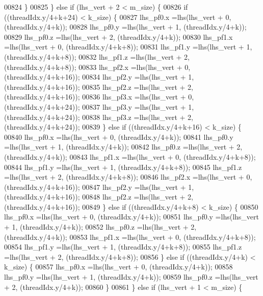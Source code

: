 \begin{DoxyCode}
00824         \}
00825       \} \textcolor{keywordflow}{else} \textcolor{keywordflow}{if} (lhs\_vert + 2 < m\_size) \{
00826         \textcolor{keywordflow}{if} ((threadIdx.y/4+k+24) < k\_size) \{
00827           lhs\_pf0.x =lhs(lhs\_vert + 0, (threadIdx.y/4+k));
00828           lhs\_pf0.y =lhs(lhs\_vert + 1, (threadIdx.y/4+k));
00829           lhs\_pf0.z =lhs(lhs\_vert + 2, (threadIdx.y/4+k));
00830           lhs\_pf1.x =lhs(lhs\_vert + 0, (threadIdx.y/4+k+8));
00831           lhs\_pf1.y =lhs(lhs\_vert + 1, (threadIdx.y/4+k+8));
00832           lhs\_pf1.z =lhs(lhs\_vert + 2, (threadIdx.y/4+k+8));
00833           lhs\_pf2.x =lhs(lhs\_vert + 0, (threadIdx.y/4+k+16));
00834           lhs\_pf2.y =lhs(lhs\_vert + 1, (threadIdx.y/4+k+16));
00835           lhs\_pf2.z =lhs(lhs\_vert + 2, (threadIdx.y/4+k+16));
00836           lhs\_pf3.x =lhs(lhs\_vert + 0, (threadIdx.y/4+k+24));
00837           lhs\_pf3.y =lhs(lhs\_vert + 1, (threadIdx.y/4+k+24));
00838           lhs\_pf3.z =lhs(lhs\_vert + 2, (threadIdx.y/4+k+24));
00839         \} \textcolor{keywordflow}{else} \textcolor{keywordflow}{if} ((threadIdx.y/4+k+16) < k\_size) \{
00840           lhs\_pf0.x =lhs(lhs\_vert + 0, (threadIdx.y/4+k));
00841           lhs\_pf0.y =lhs(lhs\_vert + 1, (threadIdx.y/4+k));
00842           lhs\_pf0.z =lhs(lhs\_vert + 2, (threadIdx.y/4+k));
00843           lhs\_pf1.x =lhs(lhs\_vert + 0, (threadIdx.y/4+k+8));
00844           lhs\_pf1.y =lhs(lhs\_vert + 1, (threadIdx.y/4+k+8));
00845           lhs\_pf1.z =lhs(lhs\_vert + 2, (threadIdx.y/4+k+8));
00846           lhs\_pf2.x =lhs(lhs\_vert + 0, (threadIdx.y/4+k+16));
00847           lhs\_pf2.y =lhs(lhs\_vert + 1, (threadIdx.y/4+k+16));
00848           lhs\_pf2.z =lhs(lhs\_vert + 2, (threadIdx.y/4+k+16));
00849         \} \textcolor{keywordflow}{else} \textcolor{keywordflow}{if} ((threadIdx.y/4+k+8) < k\_size) \{
00850           lhs\_pf0.x =lhs(lhs\_vert + 0, (threadIdx.y/4+k));
00851           lhs\_pf0.y =lhs(lhs\_vert + 1, (threadIdx.y/4+k));
00852           lhs\_pf0.z =lhs(lhs\_vert + 2, (threadIdx.y/4+k));
00853           lhs\_pf1.x =lhs(lhs\_vert + 0, (threadIdx.y/4+k+8));
00854           lhs\_pf1.y =lhs(lhs\_vert + 1, (threadIdx.y/4+k+8));
00855           lhs\_pf1.z =lhs(lhs\_vert + 2, (threadIdx.y/4+k+8));
00856         \} \textcolor{keywordflow}{else} \textcolor{keywordflow}{if} ((threadIdx.y/4+k) < k\_size) \{
00857           lhs\_pf0.x =lhs(lhs\_vert + 0, (threadIdx.y/4+k));
00858           lhs\_pf0.y =lhs(lhs\_vert + 1, (threadIdx.y/4+k));
00859           lhs\_pf0.z =lhs(lhs\_vert + 2, (threadIdx.y/4+k));
00860         \}
00861       \} \textcolor{keywordflow}{else} \textcolor{keywordflow}{if} (lhs\_vert + 1 < m\_size) \{

\end{DoxyCode}
